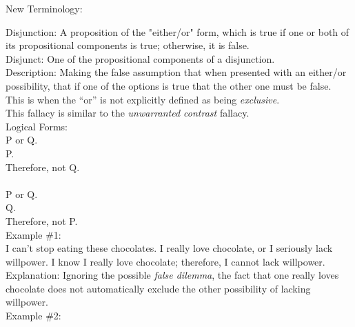 \documentclass[a4paper,12pt,single,pdftex]{scrartcl}
\begin{document}
  
    New Terminology:

    
      Disjunction: A proposition of the "either/or" form, which is true if one or both of its propositional components is true; otherwise, it is false.
    \\

    
      Disjunct: One of the propositional components of a disjunction.
    \\

    
      Description: Making the false assumption that when presented with an either/or possibility, that if one of the options is true that the other one must be false.  This is when the “or” is not explicitly defined as being {\it exclusive}.
    \\

    
      This fallacy is similar to the {\it unwarranted contrast} fallacy.
    \\

    
      Logical Forms:
    \\

    
      P or Q.
    \\

    
      P.
    \\

    
      Therefore, not Q.
    \\

    
       
    \\

    
      P or Q.
    \\

    
      Q.
    \\

    
      Therefore, not P.
    \\

    
      Example \#1:
    \\

    
      I can’t stop eating these chocolates.  I really love chocolate, or I seriously lack willpower.  I know I really love chocolate; therefore, I cannot lack willpower.
    \\

    
      Explanation: Ignoring the possible {\it false dilemma}, the fact that one really loves chocolate does not automatically exclude the other possibility of lacking willpower.
    \\

    
      Example \#2:
    \\
\end{document}
